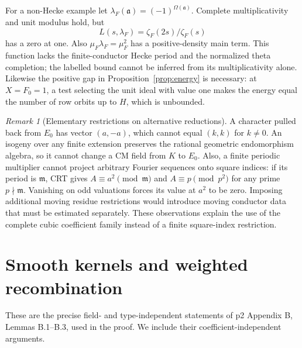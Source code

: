 \documentclass[11pt,a4paper]{article}
\numberwithin{equation}{section}
\theoremstyle{definition}
\theoremstyle{remark}
\newtheorem{remark}[theorem]{Remark}
\begin{document}
For a non-Hecke example let $\lambda_F(\mathfrak a)=(-1)^{\Omega(\mathfrak a)}$. Complete multiplicativity and unit modulus hold, but
\[
 L(s,\lambda_F)=\zeta_F(2s)/\zeta_F(s)
\]
has a zero at one. Also $\mu_F\lambda_F=\mu_F^2$ has a positive-density main term. This function lacks the finite-conductor Hecke period and the normalized theta completion; the labelled bound cannot be inferred from its multiplicativity alone. Likewise the positive gap in Proposition~\ref{prop:energy} is necessary: at $X=F_0=1$, a test selecting the unit ideal with value one makes the energy equal the number of row orbits up to $H$, which is unbounded.

\begin{remark}[Elementary restrictions on alternative reductions]
A character pulled back from $E_0$ has vector $(a,-a)$, which cannot equal $(k,k)$ for $k\ne0$. An isogeny over any finite extension preserves the rational geometric endomorphism algebra, so it cannot change a CM field from $K$ to $E_0$. Also, a finite periodic multiplier cannot project arbitrary Fourier sequences onto square indices: if its period is $\mathfrak m$, CRT gives $A\equiv a^2\pmod{\mathfrak m}$ and $A\equiv p\pmod{p^2}$ for any prime $p\nmid\mathfrak m$. Vanishing on odd valuations forces its value at $a^2$ to be zero. Imposing additional moving residue restrictions would introduce moving conductor data that must be estimated separately. These observations explain the use of the complete cubic coefficient family instead of a finite square-index restriction.
\end{remark}

\appendix
\section{Smooth kernels and weighted recombination}\label{app:smooth}
These are the precise field- and type-independent statements of p2 Appendix B, Lemmas B.1--B.3, used in the proof. We include their coefficient-independent arguments.
\end{document}
